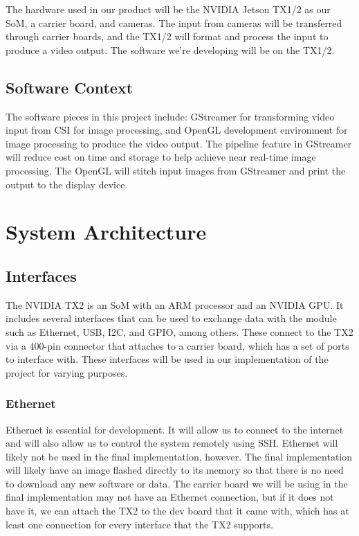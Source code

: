 \documentclass[letterpaper,10pt,serif,draftclsnofoot,onecolumn,compsoc,titlepage]{IEEEtran}
\begin{document}
The hardware used in our product will be the NVIDIA Jetson TX1/2 as our SoM, 
a carrier board, and cameras. The input from cameras will be transferred through 
carrier boards, and the TX1/2 will format and process the input to produce a 
video output. The software we're developing will be on the TX1/2. \\

\subsection{Software Context}

The software pieces in this project include: GStreamer for transforming video input 
from CSI for image processing, and OpenGL development environment for image processing 
to produce the video output. The pipeline feature in GStreamer will reduce 
cost on time and storage to help achieve near real-time image processing. The OpenGL 
will stitch input images from GStreamer and print the output to the display device. \\

\section{System Architecture}

\subsection{Interfaces}
The NVIDIA TX2 is an SoM with an ARM processor and an NVIDIA GPU. It includes several interfaces that can be used to exchange data with the module such as Ethernet, USB, I2C, and GPIO, among others. These connect to the TX2 via a 400-pin connector that attaches to a carrier board, which has a set of ports to interface with. These interfaces will be used in our implementation of the project for varying purposes.

\subsubsection{Ethernet}
Ethernet is essential for development. It will allow us to connect to the internet and will also allow us to control the system remotely using SSH. Ethernet will likely not be used in the final implementation, however. The final implementation will likely have an image flashed directly to its memory so that there is no need to download any new software or data. The carrier board we will be using in the final implementation may not have an Ethernet connection, but if it does not have it, we can attach the TX2 to the dev board that it came with, which has at least one connection for every interface that the TX2 supports.
\end{document}

